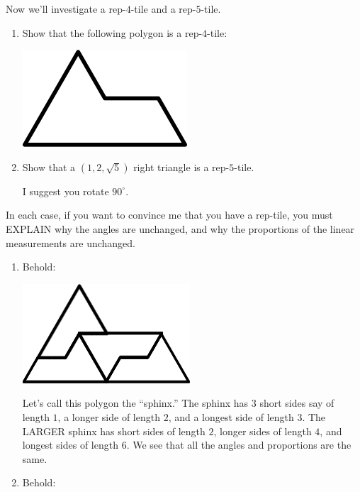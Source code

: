 \documentclass[nooutcomes,noauthor]{ximera}
\begin{document}
\mynewpage


\begin{question}
  Now we'll investigate a rep-$4$-tile and a rep-$5$-tile.
  \begin{enumerate}
  \item Show that the following polygon is a rep-$4$-tile:
    \begin{center}
      \includegraphics[width=.2\textwidth]{sphinx.png}
    \end{center}
  \item Show that a $(1,2,\sqrt{5})$ right triangle is a
    rep-$5$-tile.
    \begin{hint}
      I suggest you rotate $90^\circ$.
    \end{hint}
  \end{enumerate}
  In each case, if you want to convince me that you have a rep-tile,
  you must EXPLAIN why the angles are unchanged, and why the
  proportions of the linear measurements are unchanged.
  \begin{freeResponse}
    \begin{enumerate}
    \item Behold:
      \begin{center}
        \includegraphics[width=.4\textwidth]{STAGEsphinx.png}
      \end{center}
      Let's call this polygon the ``sphinx.'' The sphinx has $3$ short
      sides say of length $1$, a longer side of length $2$, and a
      longest side of length $3$. The LARGER sphinx has short sides of
      length $2$, longer sides of length $4$, and longest sides of
      length $6$. We see that all the angles and proportions are the
      same.
    \item Behold:
      \begin{center}
\end{center}
\end{enumerate}
\end{freeResponse}
\end{question}
\end{document}
